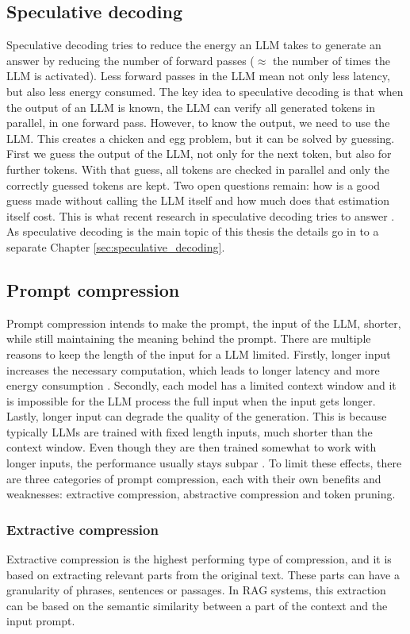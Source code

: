 \subsection{Speculative decoding}
Speculative decoding tries to reduce the energy an LLM takes to generate an answer by reducing the number of forward passes ($\approx$ the number of times the LLM is activated). Less forward passes in the LLM mean not only less latency, but also less energy consumed. The key idea to speculative decoding is that when the output of an LLM is known, the LLM can verify all generated tokens in parallel, in one forward pass. However, to know the output, we need to use the LLM. This creates a chicken and egg problem, but it can be solved by guessing. First we guess the output of the LLM, not only for the next token, but also for further tokens. With that guess, all tokens are checked in parallel and only the correctly guessed tokens are kept. Two open questions remain: how is a good guess made without calling the LLM itself and how much does that estimation itself cost. This is what recent research in speculative decoding tries to answer \cite{he2023rest, li2024eagle}. As speculative decoding is the main topic of this thesis the details go in to a separate Chapter \ref{sec:speculative_decoding}.

\subsection{Prompt compression}
Prompt compression intends to make the prompt, the input of the LLM, shorter, while still maintaining the meaning behind the prompt. There are multiple reasons to keep the length of the input for a LLM limited. Firstly, longer input increases the necessary computation, which leads to longer latency and more energy consumption \cite{kim2023arithmeticintensityllm}. Secondly, each model has a limited context window and it is impossible for the LLM process the full input when the input gets longer. Lastly, longer input can degrade the quality of the generation. This is because typically LLMs are trained with fixed length inputs, much shorter than the context window. Even though they are then trained somewhat to work with longer inputs, the performance usually stays subpar \cite{levy2024sameinputlength, liu2024lost}. To limit these effects, there are three categories of prompt compression, each with their own benefits and weaknesses: extractive compression, abstractive compression and token pruning.

\subsubsection{Extractive compression}
Extractive compression is the highest performing type of compression, and it is based on extracting relevant parts from the original text. These parts can have a granularity of phrases, sentences or passages. In RAG systems, this extraction can be based on the semantic similarity between a part of the context and the input prompt. 

